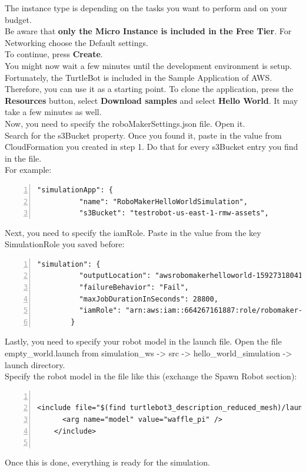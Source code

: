 \documentclass[plainarticle,zihtitle,english,final,hyperref,utf8]{zihpub}
\begin{document}
The instance type is depending on the tasks you want to perform and on your budget. \\
Be aware that \textbf{only the Micro Instance is included in the Free Tier}. 
For Networking choose the Default settings.\\
To continue, press \textbf{Create}.\\
\newline
You might now wait a few minutes until the development environment is setup. Fortunately, the TurtleBot is included in the Sample Application of AWS. Therefore, you can use it as a starting point. To clone the application, press the \textbf{Resources} button, select \textbf{Download samples} and select \textbf{Hello World}. It may take a few minutes as well.\\
\newline
Now, you need to specify the roboMakerSettings.json file. Open it. \\
Search for the s3Bucket property. Once you found it, paste in the value from CloudFormation you created in step 1. Do that for every s3Bucket entry you find in the file.\\
For example:
\begin{Verbatim}[breaklines=true, breakanywhere=true, baselinestretch=1,fontsize=\scriptsize,numbers=left,frame=single,stepnumber=5,xleftmargin=1cm,xrightmargin=1cm]
"simulationApp": {
          "name": "RoboMakerHelloWorldSimulation",
          "s3Bucket": "testrobot-us-east-1-rmw-assets",
    \end{Verbatim}
Next, you need to specify the iamRole. Paste in the value from the key SimulationRole you saved before:
\begin{Verbatim}[breaklines=true, breakanywhere=true, baselinestretch=1,fontsize=\scriptsize,numbers=left,frame=single,stepnumber=5,xleftmargin=1cm,xrightmargin=1cm]
"simulation": {
          "outputLocation": "awsrobomakerhelloworld-159273180411-bundlesbucket-1rvtpu1por607",
          "failureBehavior": "Fail",
          "maxJobDurationInSeconds": 28800,
          "iamRole": "arn:aws:iam::664267161887:role/robomaker-simulation-role-us-east-1"
        }
    \end{Verbatim}
    
\newpage
Lastly, you need to specify your robot model in the launch file. Open the file empty\_world.launch from simulation\_ws -> src -> hello\_world\_simulation -> launch directory.\\
Specify the robot model in the file like this (exchange the Spawn Robot section):
\begin{Verbatim}[breaklines=true, breakanywhere=true, baselinestretch=1,fontsize=\scriptsize,numbers=left,frame=single,stepnumber=5,xleftmargin=1cm,xrightmargin=1cm]

<include file="$(find turtlebot3_description_reduced_mesh)/launch/spawn_turtlebot.launch">
      <arg name="model" value="waffle_pi" />
    </include>
  
\end{Verbatim}
Once this is done, everything is ready for the simulation.
\newline
\end{document}
